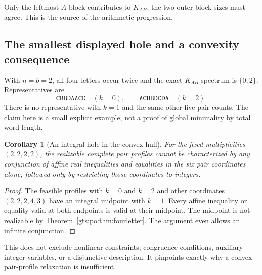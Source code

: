 \documentclass[11pt,letterpaper]{article}
\newtheorem{corollary}[theorem]{Corollary}
\theoremstyle{definition}
\theoremstyle{remark}
\begin{document}
\begin{center}
\end{center}
Only the leftmost $A$ block contributes to $K_{AB}$; the two outer block sizes must agree. This is the source of the arithmetic progression.

\subsection{The smallest displayed hole and a convexity consequence}
With $n=b=2$, all four letters occur twice and the exact $K_{AB}$ spectrum is $\{0,2\}$. Representatives are
\[
 \texttt{CBBDAACD}\quad(k=0),\qquad
 \texttt{ACBBDCDA}\quad(k=2).
\]
There is no representative with $k=1$ and the same other five pair counts. The claim here is a small explicit example, not a proof of global minimality by total word length.

\begin{corollary}[An integral hole in the convex hull]\label{gts:po:cor:convex}
For the fixed multiplicities $(2,2,2,2)$, the realizable complete pair profiles cannot be characterized by any conjunction of affine real inequalities and equalities in the six pair coordinates alone, followed only by restricting those coordinates to integers.
\end{corollary}
\begin{proof}
The feasible profiles with $k=0$ and $k=2$ and other coordinates $(2,2,2,4,3)$ have an integral midpoint with $k=1$. Every affine inequality or equality valid at both endpoints is valid at their midpoint. The midpoint is not realizable by Theorem~\ref{gts:po:thm:fourletter}. The argument even allows an infinite conjunction.
\end{proof}
This does not exclude nonlinear constraints, congruence conditions, auxiliary integer variables, or a disjunctive description. It pinpoints exactly why a convex pair-profile relaxation is insufficient.
\end{document}
